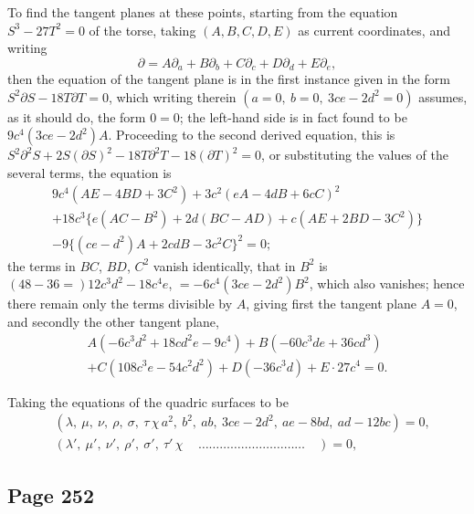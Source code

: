\documentclass[11pt,a4paper]{article}
\theoremstyle{definition}
\begin{document}
To find the tangent planes at these points, starting from the equation $S^3 - 27T^2 = 0$ of the torse, taking $(A, B, C, D, E)$ as current coordinates, and writing
\[
\partial = A\partial_a + B\partial_b + C\partial_c + D\partial_d + E\partial_e,
\]
then the equation of the tangent plane is in the first instance given in the form $S^2\partial S - 18T\partial T = 0$, which writing therein $(a = 0,\ b = 0,\ 3ce - 2d^2 = 0)$ assumes, as it should do, the form $0 = 0$; the left-hand side is in fact found to be $9c^4(3ce - 2d^2)A$. Proceeding to the second derived equation, this is $S^2\partial^2S + 2S(\partial S)^2 - 18T\partial^2T - 18(\partial T)^2 = 0$, or substituting the values of the several terms, the equation is
\begin{multline*}
9c^4(AE - 4BD + 3C^2) + 3c^2(eA - 4dB + 6cC)^2\\
+ 18c^3\{e(AC-B^2) + 2d(BC-AD) + c(AE + 2BD - 3C^2)\}\\
- 9\{(ce-d^2)A + 2cdB - 3c^2C\}^2 = 0;
\end{multline*}
the terms in $BC$, $BD$, $C^2$ vanish identically, that in $B^2$ is $(48 - 36 =) 12c^3d^2 - 18c^4e$, $= -6c^4(3ce - 2d^2)B^2$, which also vanishes; hence there remain only the terms divisible by $A$, giving first the tangent plane $A = 0$, and secondly the other tangent plane,
\begin{multline*}
A(-6c^3d^2 + 18cd^2e - 9c^4) + B(-60c^3de + 36cd^3)\\
+ C(108c^3e - 54c^2d^2) + D(-36c^3d) + E \cdot 27c^4 = 0.
\end{multline*}

Taking the equations of the quadric surfaces to be
\begin{align*}
&(\lambda,\ \mu,\ \nu,\ \rho,\ \sigma,\ \tau \,\chi\, a^2,\ b^2,\ ab,\ 3ce - 2d^2,\ ae - 8bd,\ ad - 12bc) = 0,\\
&(\lambda',\ \mu',\ \nu',\ \rho',\ \sigma',\ \tau' \,\chi\, \quad\ldots\ldots\ldots\ldots\ldots\ldots\ldots\ldots\ldots\ldots\quad) = 0,
\end{align*}

\subsection*{Page 252}
\end{document}
